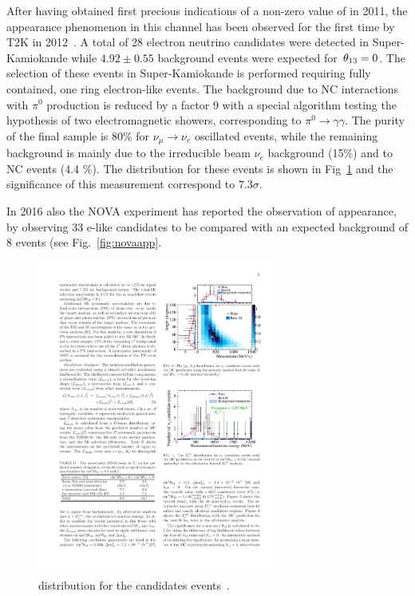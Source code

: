 After having obtained first precious indications of a non-zero value of \thint in 2011,  the \nue appearance phenomenon in this channel has been observed for the first time by T2K in 2012~\cite{Abe:2013hdq}. A total of 28 electron neutrino candidates were detected in Super-Kamiokande while $4.92\pm0.55$ background events were expected for $\textrm \,\theta_{13}=0$. The selection of these events in Super-Kamiokande is performed requiring fully contained, one ring electron-like events. The background due to NC interactions with $\pi^0$ production is reduced by a factor 9 with a special algorithm testing the hypothesis of two electromagnetic showers, corresponding to $\pi^0 \rightarrow \gamma \gamma$. The purity of the final sample is 80\% for $\nu_\mu \rightarrow \nu_e$ oscillated events, while the remaining background is mainly due to the irreducible beam $\nu_e$ background (15\%) and to NC events (4.4 \%). 
The \ptheta distribution for these events is shown in Fig~\ref{fig:t2kapp} and the significance of this measurement correspond to $7.3\sigma$. 

In 2016 also the NOVA experiment has reported the observation of \nue appearance, by observing 33 e-like candidates to be compared with an expected background of 8 events (see Fig.~\ref{fig:novaapp}.

\begin{figure} [htbp!]
\begin{center}
\includegraphics[width=8cm]{figures/nueapp_ptheta.pdf}
\caption{\label{fig:t2kapp} \ptheta distribution for the \nue candidates events~\cite{Abe:2013hdq}.}
\end{center}
\end{figure}




